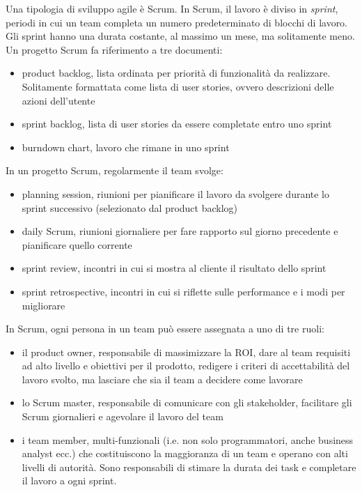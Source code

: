 \documentclass[answers, a4paper, 11pt]{exam}
\begin{document}
\begin{questions}
\begin{parts}
\begin{solution}
Una tipologia di sviluppo agile è Scrum.
In Scrum, il lavoro è diviso in \emph{sprint}, periodi in cui un team completa un numero predeterminato di blocchi di lavoro.
Gli sprint hanno una durata costante, al massimo un mese, ma solitamente meno.
Un progetto Scrum fa riferimento a tre documenti:
\begin{itemize}
    \item product backlog, lista ordinata per priorità di funzionalità da realizzare. Solitamente formattata come lista di user stories, ovvero descrizioni delle azioni dell'utente
    \item sprint backlog, lista di user stories da essere completate entro uno sprint
    \item burndown chart, lavoro che rimane in uno sprint
\end{itemize}
In un progetto Scrum, regolarmente il team svolge:
\begin{itemize}
    \item planning session, riunioni per pianificare il lavoro da svolgere durante lo sprint successivo (selezionato dal product backlog)
    \item daily Scrum, riunioni giornaliere per fare rapporto sul giorno precedente e pianificare quello corrente
    \item sprint review, incontri in cui si mostra al cliente il risultato dello sprint
    \item sprint retrospective, incontri in cui si riflette sulle performance e i modi per migliorare
\end{itemize}
In Scrum, ogni persona in un team può essere assegnata a uno di tre ruoli: 
\begin{itemize}
    \item il product owner, responsabile di massimizzare la ROI, dare al team requisiti ad alto livello e obiettivi per il prodotto, redigere i criteri di accettabilità del lavoro svolto, ma lasciare che sia il team a decidere come lavorare
    \item lo Scrum master, responsabile di comunicare con gli stakeholder, facilitare gli Scrum giornalieri e agevolare il lavoro del team
    \item i team member, multi-funzionali (i.e. non solo programmatori, anche business analyst ecc.) che costituiscono la maggioranza di un team e operano con alti livelli di autorità. Sono responsabili di stimare la durata dei task e completare il lavoro a ogni sprint. 
\end{itemize}


\end{solution}
\end{parts}
\end{questions}
\end{document}
